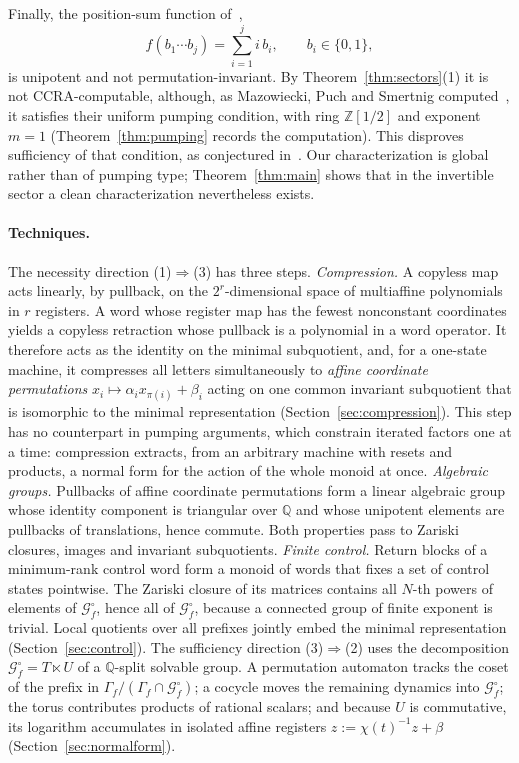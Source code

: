 \documentclass[acmlarge,screen,11pt,nonacm,natbib=false]{acmart}
\newcommand{\Q}{\mathbb{Q}}
\newcommand{\Z}{\mathbb{Z}}
\newcommand{\cG}{\mathcal{G}}
\theoremstyle{definition}
\begin{document}
Finally, the position-sum function of~\cite[Example~26]{MPSfull},
\begin{equation}\label{eq:witness}
 f(b_1\cdots b_j)=\sum_{i=1}^j i\,b_i,\qquad b_i\in\{0,1\},
\end{equation}
is unipotent and not permutation-invariant. By Theorem~\ref{thm:sectors}(1) it is not CCRA-computable, although, as Mazowiecki, Puch and Smertnig computed~\cite[Example~26]{MPSfull}, it satisfies their uniform pumping condition, with ring $\Z[1/2]$ and exponent $m=1$ (Theorem~\ref{thm:pumping} records the computation). This disproves sufficiency of that condition, as conjectured in~\cite[Section~3.2]{MPS26}. Our characterization is global rather than of pumping type; Theorem~\ref{thm:main} shows that in the invertible sector a clean characterization nevertheless exists.

\paragraph{Techniques.}
The necessity direction (1)$\Rightarrow$(3) has three steps.
\emph{Compression.} A copyless map acts linearly, by pullback, on the $2^r$-dimensional space of multiaffine polynomials in $r$ registers. A word whose register map has the fewest nonconstant coordinates yields a copyless retraction whose pullback is a polynomial in a word operator. It therefore acts as the identity on the minimal subquotient, and, for a one-state machine, it compresses all letters simultaneously to \emph{affine coordinate permutations} $x_i\mapsto\alpha_ix_{\pi(i)}+\beta_i$ acting on one common invariant subquotient that is isomorphic to the minimal representation (Section~\ref{sec:compression}). This step has no counterpart in pumping arguments, which constrain iterated factors one at a time: compression extracts, from an arbitrary machine with resets and products, a normal form for the action of the whole monoid at once.
\emph{Algebraic groups.} Pullbacks of affine coordinate permutations form a linear algebraic group whose identity component is triangular over $\Q$ and whose unipotent elements are pullbacks of translations, hence commute. Both properties pass to Zariski closures, images and invariant subquotients.
\emph{Finite control.} Return blocks of a minimum-rank control word form a monoid of words that fixes a set of control states pointwise. The Zariski closure of its matrices contains all $N$-th powers of elements of $\cG_f^\circ$, hence all of $\cG_f^\circ$, because a connected group of finite exponent is trivial. Local quotients over all prefixes jointly embed the minimal representation (Section~\ref{sec:control}).
The sufficiency direction (3)$\Rightarrow$(2) uses the decomposition $\cG_f^\circ=T\ltimes U$ of a $\Q$-split solvable group. A permutation automaton tracks the coset of the prefix in $\Gamma_f/(\Gamma_f\cap\cG_f^\circ)$; a cocycle moves the remaining dynamics into $\cG_f^\circ$; the torus contributes products of rational scalars; and because $U$ is commutative, its logarithm accumulates in isolated affine registers $z:=\chi(t)^{-1}z+\beta$ (Section~\ref{sec:normalform}).
\end{document}
